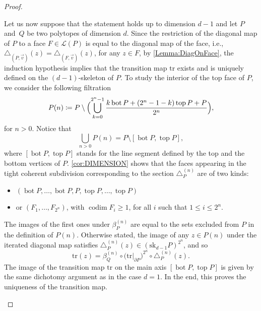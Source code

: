 \documentclass[10pt,a4paper]{amsart}
\newcommand{\ie}{i.e.,\xspace}
\numberwithin{equation}{section}\providecommand{\No}{}
\let\mathcal\mathscr
\theoremstyle{plain}
\theoremstyle{definition}
\newcommand{\La}{\mathcal{L}}
\DeclareMathOperator{\tp}{top}
\DeclareMathOperator{\bm}{bot}
\newcommand{\sk}{\mathrm{sk}}
\newcommand{\tr}{\mathrm{tr}}
\DeclareMathOperator{\codim}{codim}
\begin{document}
\begin{proof}
\begin{enumerate}
Let us now suppose that the statement holds up to dimension $d-1$ and let $P$ and~$Q$ be two polytopes of dimension $d$. Since the restriction of the diagonal map of $P$ to a face $F\in \La(P)$ is equal to the diagonal map of the face, \ie $\triangle_{(P, \vec v)}(z)=\triangle_{(F, \vec v)}(z)$, for any $z\in F$, by \cref{Lemma:DiagOnFace}, the
induction hypothesis implies that the transition map $\tr$ exists and is uniquely defined on the $(d-1)$-skeleton of $P$.
To study the interior of the top face of $P$, we consider the following filtration
\[P(n)\coloneqq P\setminus \Bigl(\bigcup_{k=0}^{2^n-1} \frac{k\bm P+(2^n-1-k)\tp P + P}{2^n} \Bigr),\]
for $n> 0$. Notice that
\[\bigcup_{n>0} P(n)=P \setminus [\bm P, \tp P],\]
where $[\bm P, \tp P]$ stands for the line segment defined by the top and the bottom vertices of $P$.
\cref{cor:DIMENSION} shows that the faces appearing in the tight coherent subdivision
corresponding to the section
$\triangle^{(n)}_P$ are of two kinds:
\begin{itemize}
\item
$(\bm P, \ldots, \bm P, P, \tp P, \ldots, \tp P)$
\item
or $(F_1, \ldots, F_{2^n})$, with
$\codim F_i\geq 1$, for all $i$ such that $1\leq i \leq 2^n$. 
\end{itemize}
The images of the first ones under $\beta^{(n)}_P$ are equal to the sets excluded from $P$ in the definition of $P(n)$. Otherwise stated, the image of any $z\in P(n)$ under the iterated diagonal map satisfies $\triangle^{(n)}_P(z)\in \left(\sk_{d-1}P\right)^{2^n}$, and so
\[\tr(z) = \beta^{(n)}_Q\circ\big(\tr|_{\partial P}\big)^{2^n}\circ\triangle^{(n)}_P(z). \]
The image of the transition map $\tr$ on the main axis $[\bm P, \tp P]$ is given by the same dichotomy argument as in the case $d=1$. In the end, this proves the uniqueness of the transition map.


\end{enumerate}
\end{proof}
\end{document}
